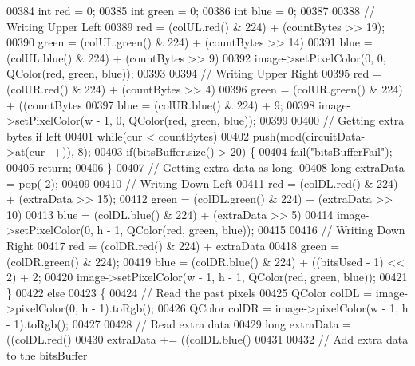 \begin{DoxyCode}
00384         \textcolor{keywordtype}{int} red = 0;
00385         \textcolor{keywordtype}{int} green = 0;
00386         \textcolor{keywordtype}{int} blue = 0;
00387 
00388         \textcolor{comment}{// Writing Upper Left}
00389         red = (colUL.red() & 224) + (countBytes >> 19);
00390         green = (colUL.green() & 224) + (countBytes >> 14) %
00391         blue = (colUL.blue() & 224) + (countBytes >> 9) %
00392         image->setPixelColor(0, 0, QColor(red, green, blue));
00393 
00394         \textcolor{comment}{// Writing Upper Right}
00395         red = (colUR.red() & 224) + (countBytes >> 4) %
00396         green = (colUR.green() & 224) + ((countBytes %
00397         blue = (colUR.blue() & 224) + 9;
00398         image->setPixelColor(w - 1, 0, QColor(red, green, blue));
00399 
00400         \textcolor{comment}{// Getting extra bytes if left}
00401         \textcolor{keywordflow}{while}(cur < countBytes)
00402             push(mod(circuitData->at(cur++)), 8);
00403         \textcolor{keywordflow}{if}(bitsBuffer.size() > 20) \{
00404             \hyperlink{class_model_p_c_a47464b59b7e37fcee25e55475708aabd}{fail}(\textcolor{stringliteral}{"bitsBufferFail"});
00405             \textcolor{keywordflow}{return};
00406         \}
00407         \textcolor{comment}{// Getting extra data as long.}
00408         \textcolor{keywordtype}{long} extraData = pop(-2);
00409 
00410         \textcolor{comment}{// Writing Down Left}
00411         red = (colDL.red() & 224) + (extraData >> 15);
00412         green = (colDL.green() & 224) + (extraData >> 10) %
00413         blue = (colDL.blue() & 224) + (extraData >> 5) %
00414         image->setPixelColor(0, h - 1, QColor(red, green, blue));
00415 
00416         \textcolor{comment}{// Writing Down Right}
00417         red = (colDR.red() & 224) + extraData %
00418         green = (colDR.green() & 224);
00419         blue = (colDR.blue() & 224) + ((bitsUsed - 1) << 2) + 2;
00420         image->setPixelColor(w - 1, h - 1, QColor(red, green, blue));
00421     \}
00422     \textcolor{keywordflow}{else}
00423     \{
00424         \textcolor{comment}{// Read the past pixels}
00425         QColor colDL = image->pixelColor(0, h - 1).toRgb();
00426         QColor colDR = image->pixelColor(w - 1, h - 1).toRgb();
00427 
00428         \textcolor{comment}{// Read extra data}
00429         \textcolor{keywordtype}{long} extraData = ((colDL.red() %
00430         extraData += ((colDL.blue() %
00431 
00432         \textcolor{comment}{// Add extra data to the bitsBuffer}

\end{DoxyCode}
